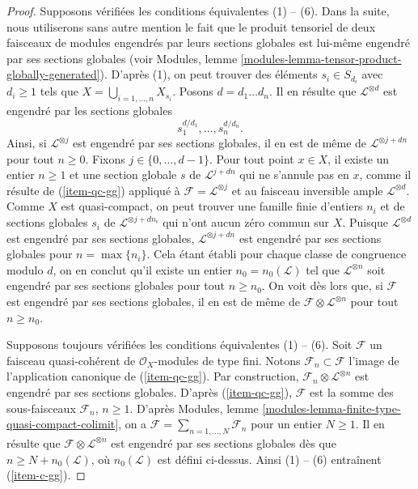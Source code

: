 \begin{proof}
\medskip\noindent
Supposons vérifiées les conditions équivalentes (1) -- (6). Dans la suite,
nous utiliserons sans autre mention le fait que le produit tensoriel de deux
faisceaux de modules engendrés par leurs sections globales est lui-même engendré par
ses sections globales
(voir Modules, lemme \ref{modules-lemma-tensor-product-globally-generated}).
D'après (1), on peut trouver des éléments $s_i \in S_{d_i}$ avec $d_i \geq 1$
tels que $X = \bigcup_{i = 1, \ldots, n} X_{s_i}$.
Posons $d = d_1\ldots d_n$. Il en résulte que $\mathcal{L}^{\otimes d}$
est engendré par les sections globales
$$
s_1^{d/d_1}, \ldots, s_n^{d/d_n}.
$$
Ainsi, si $\mathcal{L}^{\otimes j}$ est engendré par ses sections globales,
il en est de même de $\mathcal{L}^{\otimes j + dn}$ pour tout $n \geq 0$.
Fixons $j \in \{0, \ldots, d - 1\}$. Pour tout point $x \in X$, il
existe un entier $n \geq 1$ et une section globale $s$ de $\mathcal{L}^{j + dn}$
qui ne s'annule pas en $x$, comme il résulte de (\ref{item-qc-gg}) appliqué
à $\mathcal{F} = \mathcal{L}^{\otimes j}$ et au faisceau inversible
ample $\mathcal{L}^{\otimes d}$. Comme $X$ est quasi-compact, on
peut trouver une famille finie d'entiers $n_i$ et de sections globales
$s_i$ de $\mathcal{L}^{\otimes j + dn_i}$ qui n'ont aucun zéro commun
sur $X$. Puisque $\mathcal{L}^{\otimes d}$ est engendré par ses sections globales,
$\mathcal{L}^{\otimes j + dn}$ est engendré par ses sections globales pour $n = \max\{n_i\}$.
Cela étant établi pour chaque classe de congruence modulo $d$,
on en conclut qu'il existe un entier $n_0 = n_0(\mathcal{L})$ tel que
$\mathcal{L}^{\otimes n}$ soit engendré par ses sections globales pour tout $n \geq n_0$.
On voit dès lors que, si $\mathcal{F}$ est engendré par ses sections globales, il en est
de même de $\mathcal{F} \otimes \mathcal{L}^{\otimes n}$ pour tout
$n \geq n_0$.

\medskip\noindent
Supposons toujours vérifiées les conditions équivalentes (1) -- (6).
Soit $\mathcal{F}$ un faisceau
quasi-cohérent de $\mathcal{O}_X$-modules de type fini.
Notons $\mathcal{F}_n \subset \mathcal{F}$ l'image de l'application
canonique de (\ref{item-qc-gg}). Par construction,
$\mathcal{F}_n \otimes \mathcal{L}^{\otimes n}$ est
engendré par ses sections globales. D'après (\ref{item-qc-gg}),
$\mathcal{F}$ est la somme des sous-faisceaux $\mathcal{F}_n$,
$n \geq 1$.
D'après Modules, lemme \ref{modules-lemma-finite-type-quasi-compact-colimit},
on a $\mathcal{F} = \sum_{n = 1, \ldots, N} \mathcal{F}_n$
pour un entier $N \geq 1$. Il en résulte que
$\mathcal{F} \otimes \mathcal{L}^{\otimes n}$ est engendré par
ses sections globales dès que $n \geq N + n_0(\mathcal{L})$, où $n_0(\mathcal{L})$
est défini ci-dessus. Ainsi (1) -- (6) entraînent (\ref{item-c-gg}).


\end{proof}
